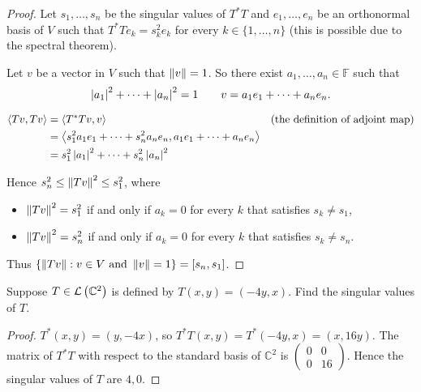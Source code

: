 \begin{proof}
    Let $s_{1}, \ldots, s_{n}$ be the singular values of $T^{*}T$ and $e_{1}, \ldots, e_{n}$ be an orthonormal basis of $V$ such that $T^{*}Te_{k} = s_{k}^{2}e_{k}$ for every $k\in\{1,\ldots,n\}$ (this is possible due to the spectral theorem).

    Let $v$ be a vector in $V$ such that $\left\Vert{v}\right\Vert = 1$. So there exist $a_{1}, \ldots, a_{n}\in\mathbb{F}$ such that
    \[
        \left\vert{a_{1}}\right\vert^{2} + \cdots + \left\vert{a_{n}}\right\vert^{2} = 1\qquad v = a_{1}e_{1} + \cdots + a_{n}e_{n}.
    \]

    \begin{align*}
        \left\langle{Tv, Tv}\right\rangle & = \left\langle{T^{*}Tv, v}\right\rangle                                                                           & \text{(the definition of adjoint map)} \\
                           & = \left\langle{s_{1}^{2}a_{1}e_{1} + \cdots + s_{n}^{2}a_{n}e_{n}, a_{1}e_{1} + \cdots + a_{n}e_{n}}\right\rangle                                          \\
                           & = s_{1}^{2}\left\vert{a_{1}}\right\vert^{2} + \cdots + s_{n}^{2}\left\vert{a_{n}}\right\vert^{2}
    \end{align*}

    Hence $s_{n}^{2}\leq \left\Vert{Tv}\right\Vert^{2}\leq s_{1}^{2}$, where
    \begin{itemize}
        \item $\left\Vert{Tv}\right\Vert^{2} = s_{1}^{2}$ if and only if $a_{k} = 0$ for every $k$ that satisfies $s_{k}\ne s_{1}$,
        \item $\left\Vert{Tv}\right\Vert^{2} = s_{n}^{2}$ if and only if $a_{k} = 0$ for every $k$ that satisfies $s_{k}\ne s_{n}$.
    \end{itemize}

    Thus $\left\{ \left\Vert{Tv}\right\Vert: v\in V\text{ and }\left\Vert{v}\right\Vert = 1\right\} = [s_{n}, s_{1}]$.
\end{proof}
\newpage

\begin{exercise}
    Suppose $T\in\mathcal{L}\left({\mathbb{C}^{2}}\right)$ is defined by $T(x, y) = (-4y, x)$. Find the singular values of $T$.
\end{exercise}

\begin{proof}
    $T^{*}(x, y) = (y, -4x)$, so $T^{*}T(x, y) = T^{*}(-4y, x) = (x, 16y)$. The matrix of $T^{*}T$ with respect to the standard basis of $\mathbb{C}^{2}$ is $\begin{pmatrix}0 & 0 \\ 0 & 16\end{pmatrix}$. Hence the singular values of $T$ are $4, 0$.
\end{proof}
\newpage

